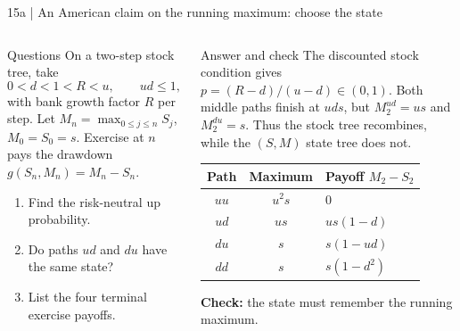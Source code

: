 \documentclass[handout,10pt,t,aspectratio=169]{beamer}
\newenvironment{questions}{\begin{block}{Questions}}{\end{block}}
\newenvironment{answers}{\begin{exampleblock}{Answer and check}}{\end{exampleblock}}
\newcommand{\compact}{\small%
 \setlength{\abovedisplayskip}{3pt}%
 \setlength{\belowdisplayskip}{3pt}%
 \setlength{\abovedisplayshortskip}{2pt}%
 \setlength{\belowdisplayshortskip}{2pt}%
 \setlength{\parskip}{2pt}}
\begin{document}
\begin{frame}{15a | An American claim on the running maximum: choose the state}
\compact
\begin{columns}[T,onlytextwidth]
\begin{questions}
On a two-step stock tree, take
\[
 0<d<1<R<u,\qquad ud\leq1,
\]
with bank growth factor \(R\) per step.
Let \(M_n=\max_{0\leq j\leq n}S_j\), \(M_0=S_0=s\).
Exercise at \(n\) pays the drawdown \(g(S_n,M_n)=M_n-S_n\).
\begin{enumerate}
\item Find the risk-neutral up probability.
\item Do paths \(ud\) and \(du\) have the same state?
\item List the four terminal exercise payoffs.
\end{enumerate}
\end{questions}
\begin{answers}
The discounted stock condition gives \(p=(R-d)/(u-d)\in(0,1)\).
Both middle paths finish at \(uds\), but \(M_2^{ud}=us\) and \(M_2^{du}=s\).
Thus the stock tree recombines, while the \((S,M)\) state tree does not.
\begin{center}\begin{tabular}{ccl}
\toprule Path & Maximum & Payoff \(M_2-S_2\)\\\midrule
\(uu\) & \(u^2s\) & \(0\)\\
\(ud\) & \(us\) & \(us(1-d)\)\\
\(du\) & \(s\) & \(s(1-ud)\)\\
\(dd\) & \(s\) & \(s(1-d^2)\)\\\bottomrule
\end{tabular}\end{center}
\textbf{Check:} the state must remember the running maximum.
\end{answers}
\end{columns}
\end{frame}
\end{document}
